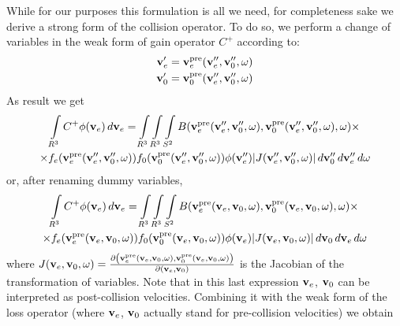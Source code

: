 \documentclass{article}[draft]
\begin{document}
While for our purposes this formulation is all we need, for completeness sake we derive a strong form of the collision operator. To do so, we perform a change of variables in the weak form of gain operator $C^+$ according to:
\begin{align*}
\vect{v}_e^\prime &= \vect{v}_e^\text{pre} \of{\vect{v}_e^{\prime\prime}, \vect{v}_0^{\prime\prime}, \vect{\omega}}
\\
\vect{v}_0^\prime &= \vect{v}_0^\text{pre} \of{\vect{v}_e^{\prime\prime}, \vect{v}_0^{\prime\prime}, \vect{\omega}}
\end{align*}
As result we get
\begin{multline*}
\myint_{R^3} C^+ \phi\of{\vect{v}_e} \diff{\vect{v}_e} 
= 
\myint_{R^3} \myint_{R^3} \myint_{S^2} 
B\of{\vect{v}_e^\text{pre} \of{\vect{v}_e^{\prime\prime}, \vect{v}_0^{\prime\prime}, \vect{\omega}}, \vect{v}_0^\text{pre} \of{\vect{v}_e^{\prime\prime}, \vect{v}_0^{\prime\prime}, \vect{\omega}}, \vect{\omega}} 
\times
\\
\times
f_e\of{\vect{v}_e^\text{pre} \of{\vect{v}_e^{\prime\prime}, \vect{v}_0^{\prime\prime}, \vect{\omega}}} 
f_0\of{\vect{v}_0^\text{pre} \of{\vect{v}_e^{\prime\prime}, \vect{v}_0^{\prime\prime}, \vect{\omega}}} 
\phi\of{\vect{v}_e^{\prime\prime}} 
|J\of{\vect{v}_e^{\prime\prime}, \vect{v}_0^{\prime\prime}, \vect{\omega}}|
\diff{\vect{v}_0^{\prime\prime}} \diff{\vect{v}_e^{\prime\prime}} \diff{\vect{\omega}}
\end{multline*}
or, after renaming dummy variables,
\begin{multline*}
\myint_{R^3} C^+ \phi\of{\vect{v}_e} \diff{\vect{v}_e} 
= 
\myint_{R^3} \myint_{R^3} \myint_{S^2} 
B\of{\vect{v}_e^\text{pre} \of{\vect{v}_e, \vect{v}_0, \vect{\omega}}, \vect{v}_0^\text{pre} \of{\vect{v}_e, \vect{v}_0, \vect{\omega}}, \vect{\omega}} 
\times
\\
\times
f_e\of{\vect{v}_e^\text{pre} \of{\vect{v}_e, \vect{v}_0, \vect{\omega}}} 
f_0\of{\vect{v}_0^\text{pre} \of{\vect{v}_e, \vect{v}_0, \vect{\omega}}} 
\phi\of{\vect{v}_e} 
|J\of{\vect{v}_e, \vect{v}_0, \vect{\omega}}|
\diff{\vect{v}_0} \diff{\vect{v}_e} \diff{\vect{\omega}}
\end{multline*}
where $J\of{\vect{v}_e, \vect{v}_0, \vect{\omega}} = \frac{ \partial \left( \vect{v}_e^\text{pre}\of{\vect{v}_e, \vect{v}_0, \vect{\omega}}, \vect{v}_0^\text{pre}\of{\vect{v}_e, \vect{v}_0, \vect{\omega}} \right)}{\partial \left( \vect{v}_e, \vect{v}_0 \right)}$ is the Jacobian of the transformation of variables. Note that in this last expression $\mathbf{v}_e$, $\mathbf{v}_0$ can be interpreted as post-collision velocities. Combining it with the weak form of the loss operator (where $\mathbf{v}_e$, $\mathbf{v}_0$ actually stand for pre-collision velocities) we obtain
\end{document}
